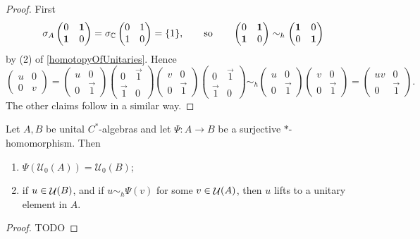 \begin{proof}
First
\[ \sigma_A \begin{pmatrix}
0 & \boldsymbol{\mathrm{1}} \\ \boldsymbol{\mathrm{1}} & 0
\end{pmatrix} = \sigma_{\mathbb{C}} \begin{pmatrix}
0 & 1 \\ 1 & 0
\end{pmatrix} = \{1\}, \qquad \text{so} \qquad \begin{pmatrix}
0 & \boldsymbol{\mathrm{1}} \\ \boldsymbol{\mathrm{1}} & 0
\end{pmatrix} \sim_h \begin{pmatrix}
\boldsymbol{\mathrm{1}} & 0 \\ 0 & \boldsymbol{\mathrm{1}}
\end{pmatrix} \]
by (2) of \ref{homotopyOfUnitaries}.
Hence
\[ \begin{pmatrix}
u & 0 \\ 0 & v
\end{pmatrix} = \begin{pmatrix}
u & 0 \\ 0 & \vec{1}
\end{pmatrix}\begin{pmatrix}
0 & \vec{1} \\ \vec{1} & 0
\end{pmatrix}\begin{pmatrix}
v & 0 \\ 0 & \vec{1}
\end{pmatrix}\begin{pmatrix}
0 & \vec{1} \\ \vec{1} & 0
\end{pmatrix} \sim_h \begin{pmatrix}
u & 0 \\ 0 & \vec{1}
\end{pmatrix}\begin{pmatrix}
v & 0 \\ 0 & \vec{1}
\end{pmatrix} = \begin{pmatrix}
uv & 0 \\ 0 & \vec{1}
\end{pmatrix}.
 \]
 The other claims follow in a similar way.
\end{proof}

\begin{lemma} \label{unitaryLifting}
Let $A,B$ be unital $C^*$-algebras and let $\Psi: A \to B$ be a surjective $*$-homomorphism. Then
\begin{enumerate}
\item $\Psi\left(\mathcal{U}_0(A)\right) = \mathcal{U}_0(B)$;
\item if $u\in\mathop{\mathcal{U}}\nolimits(B)$, and if $u \sim_h \Psi(v)$ for some $v\in\mathop{\mathcal{U}}\nolimits(A)$, then $u$ lifts to a unitary element in $A$.
\end{enumerate}
\end{lemma}
\begin{proof}
TODO
\end{proof}

